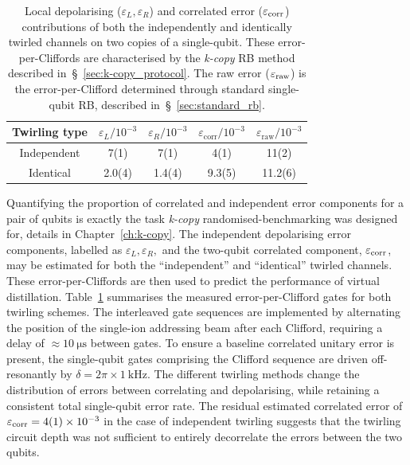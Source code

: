 \begin{table}
    \begin{center}
    \begin{tabular}{|c|c|c|c|c|}
        \hline
        Twirling type &$\varepsilon_L / 10^{-3}$&$\varepsilon_R/ 10^{-3}$ & $\varepsilon_\mathrm{corr}/ 10^{-3}$& $\varepsilon_\mathrm{raw}/ 10^{-3}$\\
        \hline
        Independent &7(1)  & 7(1)  & 4(1) & 11(2)\\
        Identical   &2.0(4)  &1.4(4)  &9.3(5) & 11.2(6)\\
        \hline
    \end{tabular}
    \end{center}
    \caption{
        Local depolarising ($\varepsilon_L, \varepsilon_R$) and correlated error ($\varepsilon_{\rm corr}$) contributions of both the
        independently and identically twirled channels on two copies of a
        single-qubit. These error-per-Cliffords are characterised by the
        \emph{k-copy} RB method described in~\S~\ref{sec:k-copy_protocol}.
        The raw error ($\varepsilon_{\rm raw}$) is the error-per-Clifford determined through standard single-qubit RB, described in~\S~\ref{sec:standard_rb}.
        }
    \label{tab:VD_k-copy}
\end{table}
Quantifying the proportion of correlated and independent error components for a pair of qubits is exactly the task \emph{k-copy} randomised-benchmarking was designed for, details in Chapter~\ref{ch:k-copy}. The independent depolarising error components, labelled as $\varepsilon_L, \varepsilon_R,$ and the two-qubit correlated component, $\varepsilon_{\rm corr}$, may be estimated for both the ``independent'' and ``identical'' twirled channels. These error-per-Cliffords are then used to predict the performance of virtual distillation. Table~\ref{tab:VD_k-copy} summarises the measured error-per-Clifford gates for both twirling schemes.
The interleaved gate sequences are
implemented by alternating the position of the single-ion addressing beam after
each Clifford, requiring a delay of $\approx 10~\unit{\micro\second}$ between
gates.
To ensure a baseline correlated
unitary error is present, the single-qubit gates comprising the Clifford
sequence are driven off-resonantly by $\delta = 2\pi\times 1~\unit{\kilo\hertz}$. 
The different twirling methods change the
distribution of errors between correlating and depolarising, while retaining a
consistent total single-qubit error rate. The residual estimated correlated error of $\varepsilon_{\rm corr} = 4(1)\times10^{-3}$ in the case of independent twirling suggests that the twirling circuit depth was not sufficient to entirely decorrelate the
errors between the two qubits. 

